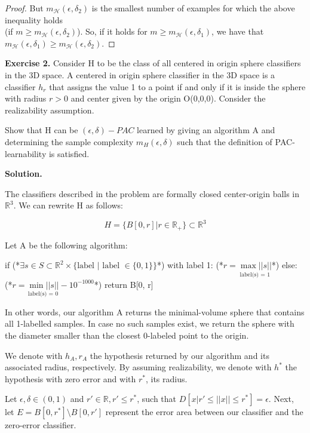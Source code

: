 \documentclass{article}
\newcommand{\<}{\langle}
\renewcommand{\>}{\rangle}
\theoremstyle{definition}
\def\gH{{\mathcal{H}}}
\newcommand{\mgh}{m_{\gH}}
\newcommand{\mgh}{m_{\gH}}
\begin{document}
\begin{enumerate}[label=\alph*)]
\begin{proof}
  But $\mgh(\epsilon, \delta_2)$ is the smallest number of examples for which the above
  inequality holds\\(if ${m \geq \mgh(\epsilon, \delta_2)}$). So, if it holds for
  $m \geq \mgh(\epsilon, \delta_1)$, we have that
  $\mgh(\epsilon, \delta_1) \geq \mgh(\epsilon, \delta_2)$.
  \end{proof}
\end{enumerate}

\textbf{Exercise 2.} Consider H to be the class of all centered in origin sphere classifiers in the 3D space. A centered in origin sphere classifier in the 3D space is a classifier $h_r$ that assigns the value 1 to a point if and only if it is inside the sphere with radius $r > 0$ and center given by the origin O(0,0,0). Consider the realizability assumption. 

Show that H can be $(\epsilon, \delta)-PAC$ learned by giving an algorithm A and determining the sample complexity $m_H (\epsilon, \delta)$ such that the definition of PAC-learnability is satisfied.

\textbf{Solution.}

The classifiers described in the problem are formally closed center-origin balls in $\mathbb{R}^3$. We can rewrite H as follows:

$$H = \{ B[0, r] | r \in \mathbb{R}_{+}\} \subset \mathbb{R}^3$$

Let A be the following algorithm:

\begin{mylisting}
if (*$\exists s \in S \subset \mathbb{R}^2 \times \{\text{label } | \text{ label } \in \{0,1\} \}$*) with label 1:
    (*$r = \underset{\text{label(s) = 1} }{\max ||s||}$*)
else:
    (*$r = \underset{\text{label(s) = 0}}{\min ||s||} - 10^{-1000} $*)
return B[0, r]
\end{mylisting}

In other words, our algorithm A returns the minimal-volume sphere that contains all 1-labelled samples. In case no such samples exist, we return the sphere with the diameter smaller than the closest 0-labeled point to the origin.

We denote with $h_A, r_A$ the hypothesis returned by our algorithm and its associated radius, respectively. By assuming realizability, we denote with $h^*$ the hypothesis with zero error and with $r^*$, its radius. 

Let $\epsilon, \delta \in (0,1)$ and $r' \in \mathbb{R}, r' \leq r^*$, such that $D[{x|r' \leq ||x|| \leq r^*}] = \epsilon$. Next, let $E=B[0, r^*] \setminus B[0, r']$ represent the error area between our classifier and the zero-error classifier. 
\end{document}
